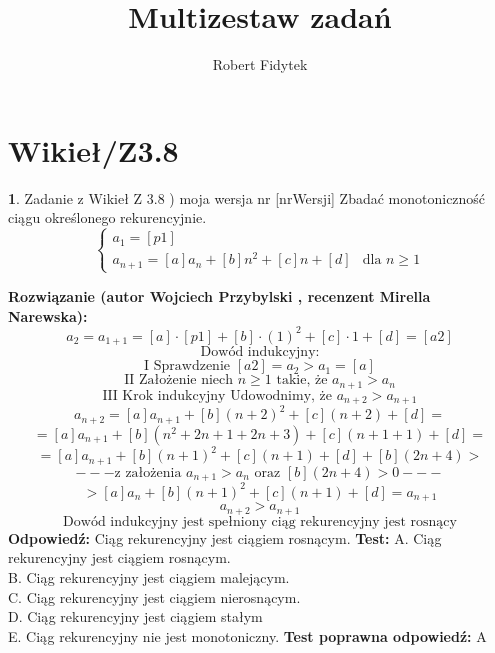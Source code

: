 \documentclass[12pt, a4paper]{article}
\title{Multizestaw zadań}
\author{Robert Fidytek}
\date{}
\theoremstyle{definition} %
\newtheorem{zad}{}
\newcommand{\kategoria}[1]{\section{#1}} %
\newcommand{\zadStart}[1]{\begin{zad}#1\newline} %
\newcommand{\zadStop}{\end{zad}}   %
\newcommand{\rozwStart}[2]{\noindent \textbf{Rozwiązanie (autor #1 , recenzent #2): }\newline} %
\newcommand{\rozwStop}{\newline}                                            %
\newcommand{\odpStart}{\noindent \textbf{Odpowiedź:}\newline}    %
\newcommand{\odpStop}{\newline}                                             %
\newcommand{\testStart}{\noindent \textbf{Test:}\newline} %
\newcommand{\testStop}{\newline} %
\newcommand{\kluczStart}{\noindent \textbf{Test poprawna odpowiedź:}\newline} %
\newcommand{\kluczStop}{\newline} %
\begin{document}
\maketitle


\kategoria{Wikieł/Z3.8}
\zadStart{Zadanie z Wikieł Z 3.8 ) moja wersja nr [nrWersji]}
Zbadać monotoniczność ciągu określonego rekurencyjnie.
$$
 \left\{ \begin{array}{ll}
a_{1}= [p1] & \\
a_{n+1}=[a]a_{n}+[b]n^{2}+[c]n+[d]  & \mbox{dla }n\geq1
\end{array} \right.
$$
\zadStop
\rozwStart{Wojciech Przybylski}{Mirella Narewska}
$$a_{2}=a_{1+1}=[a]\cdot[p1]+[b]\cdot(1)^{2}+[c]\cdot1+[d]=[a2] $$
$$\mbox{Dowód indukcyjny:}$$
$$\mbox{I Sprawdzenie } [a2]=a_{2}>a_{1}=[a]$$
$$\mbox{II Założenie niech }n\geq1 \mbox{ takie, że } a_{n+1}>a_{n}$$
$$\mbox{III Krok indukcyjny }\mbox{Udowodnimy, że } a_{n+2}>a_{n+1}$$
$$a_{n+2}=[a]a_{n+1}+[b](n+2)^{2}+[c](n+2)+[d]=$$
$$=[a]a_{n+1}+[b](n^{2}+2n+1+2n+3)+[c](n+1+1)+[d]=$$
$$=[a]a_{n+1}+[b](n+1)^{2}+[c](n+1)+[d]+[b](2n+4)>$$
$$---\mbox{z założenia }a_{n+1}>a_{n} \mbox{ oraz } [b](2n+4)>0---$$
$$>[a]a_{n}+[b](n+1)^{2}+[c](n+1)+[d]=a_{n+1}$$
$$a_{n+2}>a_{n+1}$$
$$\mbox{Dowód indukcyjny jest spełniony ciąg rekurencyjny jest rosnący}$$
\rozwStop
\odpStart
Ciąg rekurencyjny jest ciągiem rosnącym.
\odpStop
\testStart
A. Ciąg rekurencyjny jest ciągiem rosnącym.\\
B. Ciąg rekurencyjny jest ciągiem malejącym.\\
C. Ciąg rekurencyjny jest ciągiem nierosnącym.\\
D. Ciąg rekurencyjny jest ciągiem stałym\\
E. Ciąg rekurencyjny nie jest monotoniczny.
\testStop
\kluczStart
A
\kluczStop
\end{document}

